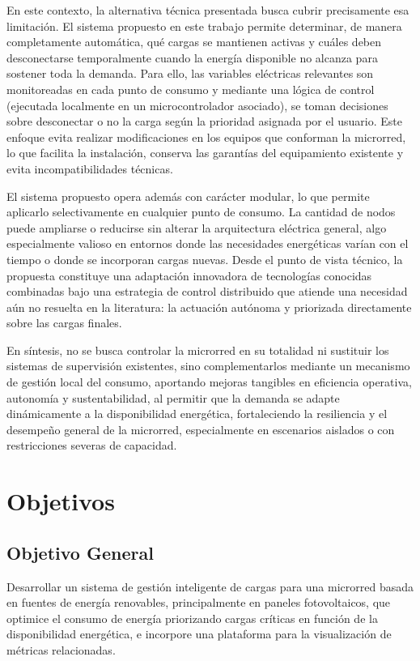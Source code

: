 En este contexto, la alternativa técnica presentada busca cubrir precisamente esa limitación. El sistema propuesto en este trabajo permite determinar, de manera completamente automática, qué cargas se mantienen activas y cuáles deben desconectarse temporalmente cuando la energía disponible no alcanza para sostener toda la demanda. Para ello, las variables eléctricas relevantes son monitoreadas en cada punto de consumo y mediante una lógica de control (ejecutada localmente en un microcontrolador asociado), se toman decisiones sobre desconectar o no la carga según la prioridad asignada por el usuario. Este enfoque evita realizar modificaciones en los equipos que conforman la microrred, lo que facilita la instalación, conserva las garantías del equipamiento existente y evita incompatibilidades técnicas.

El sistema propuesto opera además con carácter modular, lo que permite aplicarlo selectivamente en cualquier punto de consumo. La cantidad de nodos puede ampliarse o reducirse sin alterar la arquitectura eléctrica general, algo especialmente valioso en entornos donde las necesidades energéticas varían con el tiempo o donde se incorporan cargas nuevas. Desde el punto de vista técnico, la propuesta constituye una adaptación innovadora de tecnologías conocidas combinadas bajo una estrategia de control distribuido que atiende una necesidad aún no resuelta en la literatura: la actuación autónoma y priorizada directamente sobre las cargas finales.

En síntesis, no se busca controlar la microrred en su totalidad ni sustituir los sistemas de supervisión existentes, sino complementarlos mediante un mecanismo de gestión local del consumo, aportando mejoras tangibles en eficiencia operativa, autonomía y sustentabilidad, al permitir que la demanda se adapte dinámicamente a la disponibilidad energética, fortaleciendo la resiliencia y el desempeño general de la microrred, especialmente en escenarios aislados o con restricciones severas de capacidad.
\section{Objetivos}

\subsection{Objetivo General}
Desarrollar un sistema de gestión inteligente de cargas para una microrred basada en fuentes de energía renovables, principalmente en paneles fotovoltaicos, que optimice el consumo de energía priorizando cargas críticas en función de la disponibilidad energética, e incorpore una plataforma para la visualización de métricas relacionadas.

